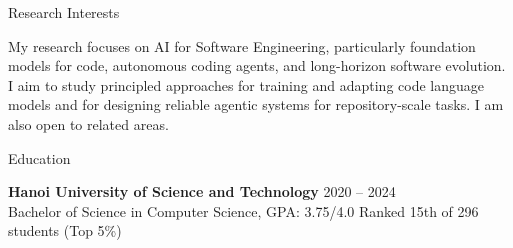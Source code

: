 \documentclass{resume} %
\begin{document}

\begin{rSection}{Research Interests}

My research focuses on AI for Software Engineering, particularly foundation models for
code, autonomous coding agents, and long-horizon software evolution. I aim to study
principled approaches for training and adapting code language models and for designing
reliable agentic systems for repository-scale tasks. I am also open to related areas.

\end{rSection}


\begin{rSection}{Education}

\textbf{Hanoi University of Science and Technology} \hfill 2020 -- 2024\\
Bachelor of Science in Computer Science, GPA: 3.75/4.0
\hfill Ranked 15th of 296 students (Top 5\%)

\end{rSection}

\end{document}
